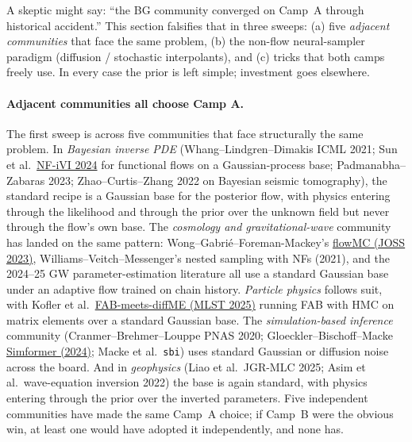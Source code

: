 \documentclass[11pt,letterpaper]{article}
\theoremstyle{plain}
\begin{document}
\begin{callout}
A skeptic might say: ``the BG community converged on Camp~A through historical
accident.'' This section falsifies that in three sweeps: (a) five \emph{adjacent
communities} that face the same problem, (b) the non-flow neural-sampler
paradigm (diffusion / stochastic interpolants), and (c) tricks that both
camps freely use. In every case the prior is left simple; investment goes
elsewhere.
\end{callout}

\paragraph{Adjacent communities all choose Camp A.} The first sweep is
across five communities that face structurally the same problem. In
\emph{Bayesian inverse PDE} (Whang--Lindgren--Dimakis ICML 2021;
Sun et al.\ \href{https://arxiv.org/abs/2411.13277}{NF-iVI 2024} for
functional flows on a Gaussian-process base; Padmanabha--Zabaras 2023;
Zhao--Curtis--Zhang 2022 on Bayesian seismic tomography), the standard
recipe is a Gaussian base for the posterior flow, with physics entering
through the likelihood and through the prior over the unknown field but
never through the flow's own base. The \emph{cosmology and gravitational-wave}
community has landed on the same pattern: Wong--Gabrié--Foreman-Mackey's
\href{https://joss.theoj.org/papers/10.21105/joss.05021.pdf}{flowMC (JOSS
2023)}, Williams--Veitch--Messenger's nested sampling with NFs (2021), and
the 2024--25 GW parameter-estimation literature all use a standard Gaussian
base under an adaptive flow trained on chain history. \emph{Particle physics}
follows suit, with Kofler et al.\
\href{https://arxiv.org/abs/2411.16234}{FAB-meets-diffME (MLST 2025)} running
FAB with HMC on matrix elements over a standard Gaussian base. The
\emph{simulation-based inference} community (Cranmer--Brehmer--Louppe PNAS
2020; Gloeckler--Bischoff--Macke
\href{https://arxiv.org/abs/2404.09636}{Simformer (2024)}; Macke et al.\
\texttt{sbi}) uses standard Gaussian or diffusion noise across the board.
And in \emph{geophysics} (Liao et al.\ JGR-MLC 2025; Asim et al.\
wave-equation inversion 2022) the base is again standard, with physics
entering through the prior over the inverted parameters. Five independent
communities have made the same Camp~A choice; if Camp~B were the obvious
win, at least one would have adopted it independently, and none has.
\end{document}
